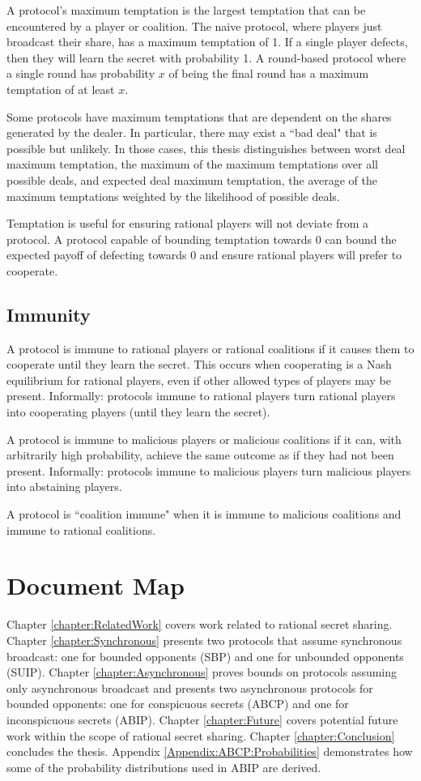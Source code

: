 \documentclass[12pt]{dalcsthesis}
\begin{document}
A protocol's maximum temptation is the largest temptation that can be encountered by a player or coalition. The naive protocol, where players just broadcast their share, has a maximum temptation of 1. If a single player defects, then they will learn the secret with probability 1. A round-based protocol where a single round has probability $x$ of being the final round has a maximum temptation of at least $x$.

Some protocols have maximum temptations that are dependent on the shares generated by the dealer. In particular, there may exist a ``bad deal" that is possible but unlikely. In those cases, this thesis distinguishes between worst deal maximum temptation, the maximum of the maximum temptations over all possible deals, and expected deal maximum temptation, the average of the maximum temptations weighted by the likelihood of possible deals.

Temptation is useful for ensuring rational players will not deviate from a protocol. A protocol capable of bounding temptation towards 0 can bound the expected payoff of defecting towards 0 and ensure rational players will prefer to cooperate.

\subsection {Immunity}
\label{Def:Immunity}

A protocol is immune to rational players or rational coalitions if it causes them to cooperate until they learn the secret. This occurs when cooperating is a Nash equilibrium for rational players, even if other allowed types of players may be present. Informally: protocols immune to rational players turn rational players into cooperating players (until they learn the secret).

A protocol is immune to malicious players or malicious coalitions if it can, with arbitrarily high probability, achieve the same outcome as if they had not been present. Informally: protocols immune to malicious players turn malicious players into abstaining players.

A protocol is ``coalition immune" when it is immune to malicious coalitions and immune to rational coalitions.

\section{Document Map}

Chapter \ref{chapter:RelatedWork} covers work related to rational secret sharing. Chapter \ref{chapter:Synchronous} presents two protocols that assume synchronous broadcast: one for bounded opponents (SBP) and one for unbounded opponents (SUIP). Chapter \ref{chapter:Asynchronous} proves bounds on protocols assuming only asynchronous broadcast and presents two asynchronous protocols for bounded opponents: one for conspicuous secrets (ABCP) and one for inconspicuous secrets (ABIP). Chapter \ref{chapter:Future} covers potential future work within the scope of rational secret sharing. Chapter \ref{chapter:Conclusion} concludes the thesis. Appendix \ref{Appendix:ABCP:Probabilities} demonstrates how some of the probability distributions used in ABIP are derived.
\end{document}

